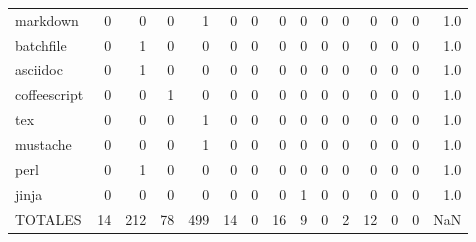 \begin{tabular}{lrrrrrrrrrrrrrr}
markdown      &        0 &       0 &          0 &               1 &                0 &       0 &          0 &          0 &         0 &         0 &      0 &             0 &         0 &      1.0 \\
batchfile     &        0 &       1 &          0 &               0 &                0 &       0 &          0 &          0 &         0 &         0 &      0 &             0 &         0 &      1.0 \\
asciidoc      &        0 &       1 &          0 &               0 &                0 &       0 &          0 &          0 &         0 &         0 &      0 &             0 &         0 &      1.0 \\
coffeescript  &        0 &       0 &          1 &               0 &                0 &       0 &          0 &          0 &         0 &         0 &      0 &             0 &         0 &      1.0 \\
tex           &        0 &       0 &          0 &               1 &                0 &       0 &          0 &          0 &         0 &         0 &      0 &             0 &         0 &      1.0 \\
mustache      &        0 &       0 &          0 &               1 &                0 &       0 &          0 &          0 &         0 &         0 &      0 &             0 &         0 &      1.0 \\
perl          &        0 &       1 &          0 &               0 &                0 &       0 &          0 &          0 &         0 &         0 &      0 &             0 &         0 &      1.0 \\
jinja         &        0 &       0 &          0 &               0 &                0 &       0 &          0 &          1 &         0 &         0 &      0 &             0 &         0 &      1.0 \\
TOTALES       &       14 &     212 &         78 &             499 &               14 &       0 &         16 &          9 &         0 &         2 &     12 &             0 &         0 &      NaN \\
\bottomrule
\end{tabular}

